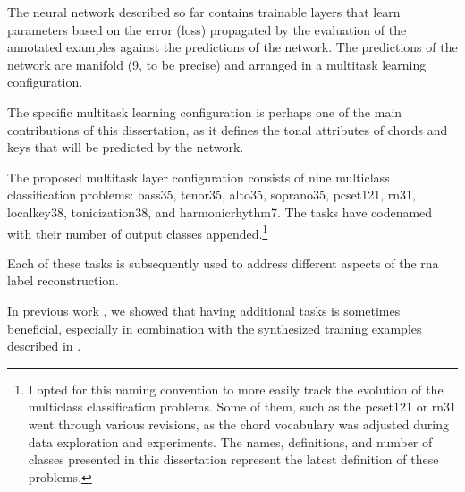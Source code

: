 
The neural network described so far contains trainable
layers that learn parameters based on the error (loss)
propagated by the evaluation of the annotated examples
against the predictions of the network. The predictions of
the network are manifold (9, to be precise) and arranged in
a multitask learning configuration.

The specific multitask learning configuration is perhaps one
of the main contributions of this dissertation, as it
defines the tonal attributes of chords and keys that will be
predicted by the network.

The proposed multitask layer configuration consists of nine
multiclass classification problems: \gls{bass35},
\gls{tenor35}, \gls{alto35}, \gls{soprano35},
\gls{pcset121}, \gls{rn31}, \gls{localkey38},
\gls{tonicization38}, and \gls{harmonicrhythm7}. The tasks
have codenamed with their number of output classes
appended.\footnote{I opted for this naming convention to
more easily track the evolution of the multiclass
classification problems. Some of them, such as the
\gls{pcset121} or \gls{rn31} went through various revisions,
as the chord vocabulary was adjusted during data exploration
and experiments. The names, definitions, and number of
classes presented in this dissertation represent the latest
definition of these problems.}

Each of these tasks is subsequently used to address
different aspects of the \gls{rna} label reconstruction.


 In previous work \parencite{napoleslopez2021augmentednet},
we showed that having additional tasks is sometimes
beneficial, especially in combination with the synthesized
training examples described in
.
